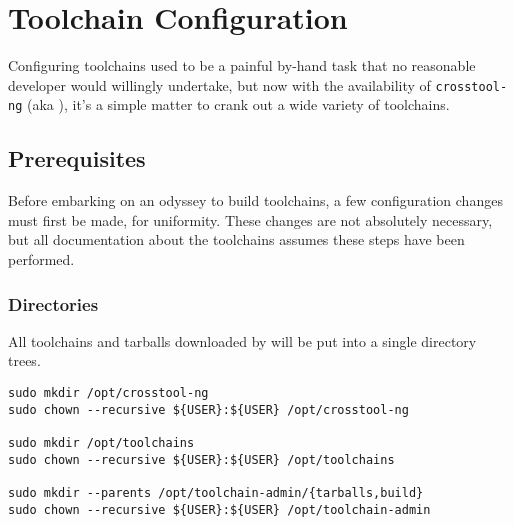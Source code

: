 %
%
%
%
\chapter{Toolchain Configuration}\label{chap:toolchain-configuration}

Configuring toolchains used to be a painful by-hand task that no
reasonable developer would willingly undertake, but now with the
availability of \texttt{crosstool-ng} (aka \ctng), it's a simple matter
to crank out a wide variety of toolchains.

\section{Prerequisites}\label{toolchain-config:prerequisites}

Before embarking on an odyssey to build toolchains, a few
configuration changes must first be made, for uniformity.  These
changes are not absolutely necessary, but all documentation about the
toolchains assumes these steps have been performed.

\subsection{Directories}
All toolchains and tarballs downloaded by \ctng will be put into a
single directory trees.

\begin{footnotesize}
\begin{verbatim}
sudo mkdir /opt/crosstool-ng
sudo chown --recursive ${USER}:${USER} /opt/crosstool-ng

sudo mkdir /opt/toolchains
sudo chown --recursive ${USER}:${USER} /opt/toolchains

sudo mkdir --parents /opt/toolchain-admin/{tarballs,build}
sudo chown --recursive ${USER}:${USER} /opt/toolchain-admin
\end{verbatim}
\end{footnotesize}

